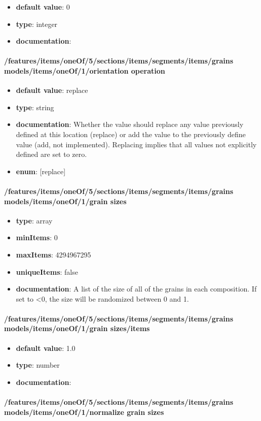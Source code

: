 \begin{itemize}\item {\bf default value}: 0
\item {\bf type}: integer
\item {\bf documentation}: 
\end{itemize}\paragraph{/features/items/oneOf/5/sections/items/segments/items/grains models/items/oneOf/1/orientation operation}
\begin{itemize}\item {\bf default value}: replace
\item {\bf type}: string
\item {\bf documentation}: Whether the value should replace any value previously defined at this location (replace) or add the value to the previously define value (add, not implemented). Replacing implies that all values not explicitly defined are set to zero.
\item {\bf enum}: [replace]\end{itemize}\paragraph{/features/items/oneOf/5/sections/items/segments/items/grains models/items/oneOf/1/grain sizes}
\begin{itemize}\item {\bf type}: array
\item {\bf minItems}: 0
\item {\bf maxItems}: 4294967295
\item {\bf uniqueItems}: false
\item {\bf documentation}: A list of the size of all of the grains in each composition. If set to <0, the size will be randomized between 0 and 1.
\end{itemize}\paragraph{/features/items/oneOf/5/sections/items/segments/items/grains models/items/oneOf/1/grain sizes/items}
\begin{itemize}\item {\bf default value}: 1.0
\item {\bf type}: number
\item {\bf documentation}: 
\end{itemize}\paragraph{/features/items/oneOf/5/sections/items/segments/items/grains models/items/oneOf/1/normalize grain sizes}
